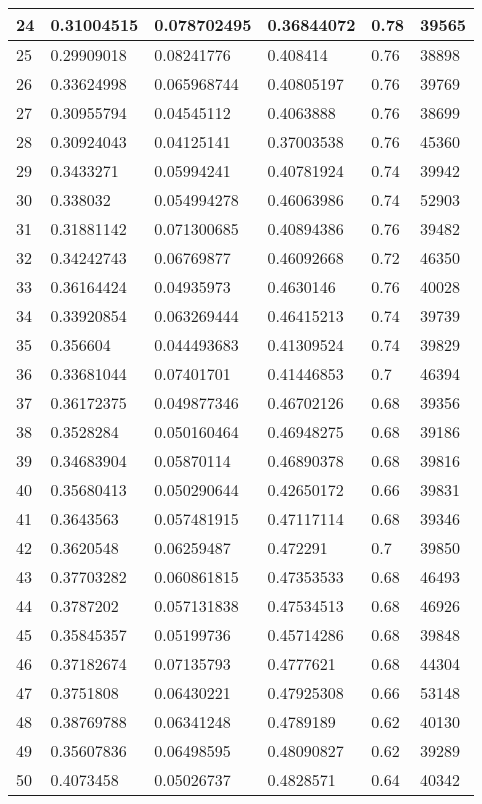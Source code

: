\begin{longtable}{|l|l|l|l|l|l|}
24 & 0.31004515 & 0.078702495 & 0.36844072 & 0.78 & 39565 \\ \hline 
25 & 0.29909018 & 0.08241776 & 0.408414 & 0.76 & 38898 \\ \hline 
26 & 0.33624998 & 0.065968744 & 0.40805197 & 0.76 & 39769 \\ \hline 
27 & 0.30955794 & 0.04545112 & 0.4063888 & 0.76 & 38699 \\ \hline 
28 & 0.30924043 & 0.04125141 & 0.37003538 & 0.76 & 45360 \\ \hline 
29 & 0.3433271 & 0.05994241 & 0.40781924 & 0.74 & 39942 \\ \hline 
30 & 0.338032 & 0.054994278 & 0.46063986 & 0.74 & 52903 \\ \hline 
31 & 0.31881142 & 0.071300685 & 0.40894386 & 0.76 & 39482 \\ \hline 
32 & 0.34242743 & 0.06769877 & 0.46092668 & 0.72 & 46350 \\ \hline 
33 & 0.36164424 & 0.04935973 & 0.4630146 & 0.76 & 40028 \\ \hline 
34 & 0.33920854 & 0.063269444 & 0.46415213 & 0.74 & 39739 \\ \hline 
35 & 0.356604 & 0.044493683 & 0.41309524 & 0.74 & 39829 \\ \hline 
36 & 0.33681044 & 0.07401701 & 0.41446853 & 0.7 & 46394 \\ \hline 
37 & 0.36172375 & 0.049877346 & 0.46702126 & 0.68 & 39356 \\ \hline 
38 & 0.3528284 & 0.050160464 & 0.46948275 & 0.68 & 39186 \\ \hline 
39 & 0.34683904 & 0.05870114 & 0.46890378 & 0.68 & 39816 \\ \hline 
40 & 0.35680413 & 0.050290644 & 0.42650172 & 0.66 & 39831 \\ \hline 
41 & 0.3643563 & 0.057481915 & 0.47117114 & 0.68 & 39346 \\ \hline 
42 & 0.3620548 & 0.06259487 & 0.472291 & 0.7 & 39850 \\ \hline 
43 & 0.37703282 & 0.060861815 & 0.47353533 & 0.68 & 46493 \\ \hline 
44 & 0.3787202 & 0.057131838 & 0.47534513 & 0.68 & 46926 \\ \hline 
45 & 0.35845357 & 0.05199736 & 0.45714286 & 0.68 & 39848 \\ \hline 
46 & 0.37182674 & 0.07135793 & 0.4777621 & 0.68 & 44304 \\ \hline 
47 & 0.3751808 & 0.06430221 & 0.47925308 & 0.66 & 53148 \\ \hline 
48 & 0.38769788 & 0.06341248 & 0.4789189 & 0.62 & 40130 \\ \hline 
49 & 0.35607836 & 0.06498595 & 0.48090827 & 0.62 & 39289 \\ \hline 
50 & 0.4073458 & 0.05026737 & 0.4828571 & 0.64 & 40342 \\ \hline 
\end{longtable}